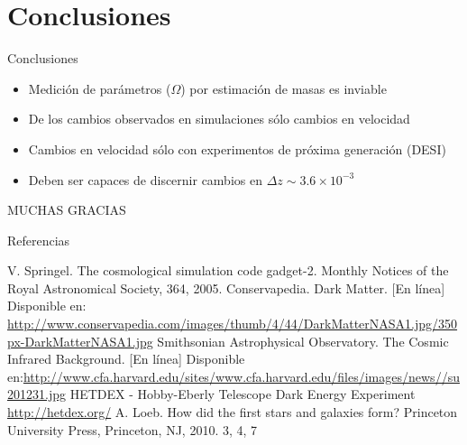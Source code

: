 \documentclass{beamer}
\begin{document}
\section{Conclusiones}
\begin{frame}{Conclusiones}
	\begin{block}{}
		\begin{itemize}
			\item Medición de parámetros ($\Omega$) por estimación de masas es inviable
			\item De los cambios observados en simulaciones sólo cambios en velocidad
			\item Cambios en velocidad sólo con experimentos de próxima generación (DESI)
			\item Deben ser capaces de discernir cambios en $\Delta z \sim 3.6\times 10^{-3}$
		\end{itemize}
	\end{block}
\end{frame}
	\begin{frame}
		\begin{center}
			\textcolor{ggray}{\Huge{MUCHAS GRACIAS}}
		\end{center}
		
	\end{frame}
	\begin{frame}[allowframebreaks]{Referencias}
		\begin{thebibliography}{}
			 V. Springel. The cosmological simulation code gadget-2. Monthly Notices of the Royal Astronomical Society, 364, 2005.
			 Conservapedia. Dark Matter. [En línea] Disponible en: \url{http://www.conservapedia.com/images/thumb/4/44/DarkMatterNASA1.jpg/350px-DarkMatterNASA1.jpg}
			 Smithsonian Astrophysical Observatory. The Cosmic Infrared Background. [En línea] Disponible en:\url{http://www.cfa.harvard.edu/sites/www.cfa.harvard.edu/files/images/news//su201231.jpg}	
			 HETDEX - Hobby-Eberly Telescope Dark Energy Experiment \url{http://hetdex.org/}
			 A. Loeb. How did the first stars and galaxies form? Princeton University Press, Princeton, NJ,
2010. 3, 4, 7

			
	\end{thebibliography}
%	
%	
	\end{frame}
\end{document}
